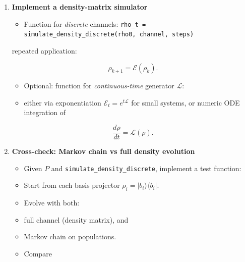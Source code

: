 \documentclass[11pt]{article}
\begin{document}
\begin{enumerate}
\begin{equation}
\rho_i = |b_i\rangle\langle b_i|,\quad
       \rho'_i = \mathcal{E}(\rho_i).
\end{equation}

\begin{itemize}
\item Define
\end{itemize}
       
\begin{equation}
P_{ji} = \langle b_j | \rho'_i | b_j \rangle.
\end{equation}

\begin{itemize}
\item Verify in code:
\item $P_{ji} \ge 0$ and each column sums to $1$ (within tolerance).
\end{itemize}

\item \textbf{Implement a density-matrix simulator}  
\begin{itemize}
\item Function for \textit{discrete} channels: \texttt{rho\_t = simulate\_density\_discrete(rho0, channel, steps)}  
\end{itemize}
       repeated application:
       
\begin{equation}
\rho_{k+1} = \mathcal{E}(\rho_k).
\end{equation}

\begin{itemize}
\item Optional: function for \textit{continuous-time} generator $\mathcal{L}$:
\item either via exponentiation $\mathcal{E}_t = e^{t \mathcal{L}}$ for small systems, or numeric ODE integration of
\end{itemize}
       
\begin{equation}
\frac{d\rho}{dt} = \mathcal{L}(\rho).
\end{equation}


\item \textbf{Cross-check: Markov chain vs full density evolution}  
\begin{itemize}
\item Given $P$ and \texttt{simulate\_density\_discrete}, implement a test function:
\item Start from each basis projector $\rho_i = |b_i\rangle\langle b_i|$.  
\item Evolve with both:
\item full channel (density matrix), and  
\item Markov chain on populations.  
\item Compare
\end{itemize}
       

\end{enumerate}
\end{document}
